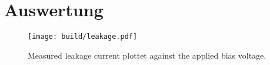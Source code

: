 \section{Auswertung}
\label{sec:Auswertung}

\begin{figure}
  \centering
  \texttt{[image: build/leakage.pdf]}
  \caption{Measured leakage current plottet against the applied bias voltage.}
  \label{fig:leakage}
\end{figure}